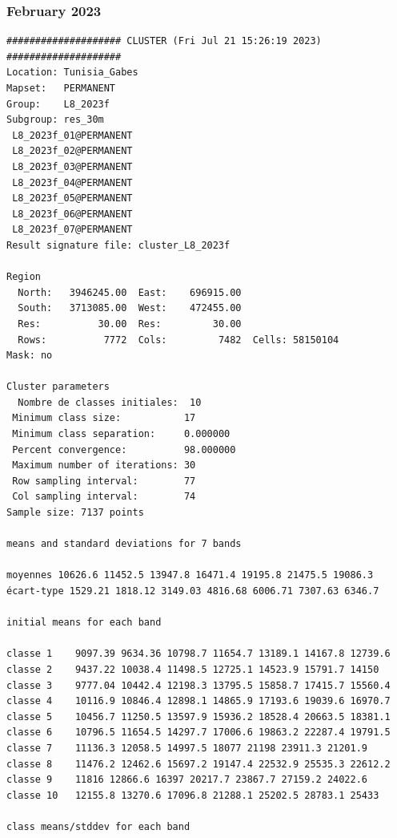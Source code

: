 \documentclass[environments,article,submit,pdftex,moreauthors]{Definitions/mdpi}
\begin{document}
\subsubsection[\appendixname~\thesubsubsection]{February 2023}
\begin{scriptsize}
\begin{verbatim}
#################### CLUSTER (Fri Jul 21 15:26:19 2023) ####################
Location: Tunisia_Gabes
Mapset:   PERMANENT
Group:    L8_2023f
Subgroup: res_30m
 L8_2023f_01@PERMANENT
 L8_2023f_02@PERMANENT
 L8_2023f_03@PERMANENT
 L8_2023f_04@PERMANENT
 L8_2023f_05@PERMANENT
 L8_2023f_06@PERMANENT
 L8_2023f_07@PERMANENT
Result signature file: cluster_L8_2023f

Region
  North:   3946245.00  East:    696915.00
  South:   3713085.00  West:    472455.00
  Res:          30.00  Res:         30.00
  Rows:          7772  Cols:         7482  Cells: 58150104
Mask: no

Cluster parameters
  Nombre de classes initiales: 	10
 Minimum class size:           17
 Minimum class separation:     0.000000
 Percent convergence:          98.000000
 Maximum number of iterations: 30
 Row sampling interval:        77
 Col sampling interval:        74
Sample size: 7137 points

means and standard deviations for 7 bands

moyennes 10626.6 11452.5 13947.8 16471.4 19195.8 21475.5 19086.3
écart-type 1529.21 1818.12 3149.03 4816.68 6006.71 7307.63 6346.7

initial means for each band

classe 1    9097.39 9634.36 10798.7 11654.7 13189.1 14167.8 12739.6
classe 2    9437.22 10038.4 11498.5 12725.1 14523.9 15791.7 14150
classe 3    9777.04 10442.4 12198.3 13795.5 15858.7 17415.7 15560.4
classe 4    10116.9 10846.4 12898.1 14865.9 17193.6 19039.6 16970.7
classe 5    10456.7 11250.5 13597.9 15936.2 18528.4 20663.5 18381.1
classe 6    10796.5 11654.5 14297.7 17006.6 19863.2 22287.4 19791.5
classe 7    11136.3 12058.5 14997.5 18077 21198 23911.3 21201.9
classe 8    11476.2 12462.6 15697.2 19147.4 22532.9 25535.3 22612.2
classe 9    11816 12866.6 16397 20217.7 23867.7 27159.2 24022.6
classe 10   12155.8 13270.6 17096.8 21288.1 25202.5 28783.1 25433

class means/stddev for each band


\end{verbatim}
\end{scriptsize}
\end{document}
